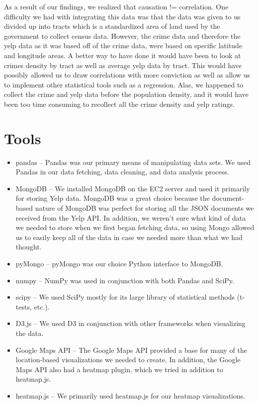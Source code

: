 \documentclass{article}
\begin{document}
As a result of our findings, we realized that causation != correlation.
One difficulty we had with integrating this data was that the data was given to us divided up into tracts which is a standardized area of land used by the government to collect census data. However, the crime data and therefore the yelp data as it was based off of the crime data, were based on specific latitude and longitude areas. A better way to have done it would have been to look at crimes density by tract as well as average yelp data by tract. This would have possibly allowed us to draw correlations with more conviction as well as allow us to implement other statistical tools such as a regression. Alas, we happened to collect the crime and yelp data before the population density, and it would have been too time consuming to recollect all the crime density and yelp ratings.

\section{Tools}

\begin{itemize}
\item pandas -- Pandas was our primary means of manipulating data sets. We
  used Pandas in our data fetching, data cleaning, and data analysis
  process.
\item MongoDB -- We installed MongoDB on the EC2 server and used it
  primarily for storing Yelp data. MongoDB was a great choice because the
  document-based nature of MongoDB was perfect for storing all the JSON
  documents we received from the Yelp API. In addition, we weren't sure
  what kind of data we needed to store when we first began fetching data,
  so using Mongo allowed us to easily keep all of the data in case we
  needed more than what we had thought.
\item pyMongo -- pyMongo was our choice Python interface to MongoDB.
\item numpy -- NumPy was used in conjunction with both Pandas and SciPy.
\item scipy -- We used SciPy mostly for its large library of statistical
  methods (t-tests, etc.).
\item D3.js -- We used D3 in conjunction with other frameworks when
  visualizing the data.
\item Google Maps API -- The Google Maps API provided a base for many of
  the location-based visualizations we needed to create. In addition, the
  Google Maps API also had a heatmap plugin, which we tried in addition to
  heatmap.js.
\item heatmap.js -- We primarily used heatmap.js for our heatmap
  visualizations.
\end{itemize}
\end{document}

